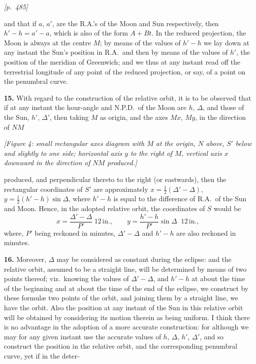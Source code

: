 \documentclass[11pt]{article}
\begin{document}
\medskip

\noindent\textit{[p.~485]}

\medskip

and that if $a$, $a'$, are the R.A.'s of the Moon and Sun respectively,
then $h'-h = a'-a$, which is also of the form $A + Bt$. In the reduced
projection, the Moon is always at the centre $M$; by means of the values
of $h'-h$ we lay down at any instant the Sun's position in R.A.\ and then
by means of the values of $h'$, the position of the meridian of
Greenwich; and we thus at any instant read off the terrestrial longitude
of any point of the reduced projection, or say, of a point on the
penumbral curve.

\medskip

\textbf{15.} With regard to the construction of the relative orbit, it is
to be observed that if at any instant the hour-angle and N.P.D.\ of the
Moon are $h$, $\Delta$, and those of the Sun, $h'$, $\Delta'$, then
taking $M$ as origin, and the axes $Mx$, $My$, in the direction of $NM$

\begin{center}
\textit{[Figure 4: small rectangular axes diagram with $M$ at the origin,
$N$ above, $S'$ below and slightly to one side; horizontal axis $y$ to the
right of $M$, vertical axis $x$ downward in the direction of $NM$
produced.]}
\end{center}

\smallskip

\noindent produced, and perpendicular thereto to the right (or
eastwards), then the rectangular coordinates of $S'$ are approximately
$x = \tfrac{1}{2}(\Delta'-\Delta)$, $y = \tfrac{1}{2}(h'-h)\sin\Delta$,
where $h'-h$ is equal to the difference of R.A.\ of the Sun and Moon.
Hence, in the adopted relative orbit, the coordinates of $S$ would be
\[
x = \frac{\Delta'-\Delta}{P'}\;12\,\text{in.}, \qquad
y = \frac{h'-h}{P'}\sin\Delta\;\;12\,\text{in.},
\]
where, $P'$ being reckoned in minutes, $\Delta'-\Delta$ and $h'-h$ are
also reckoned in minutes.

\medskip

\textbf{16.} Moreover, $\Delta$ may be considered as constant during the
eclipse: and the relative orbit, assumed to be a straight line, will be
determined by means of two points thereof; viz.\ knowing the values of
$\Delta'-\Delta$, and $h'-h$ at about the time of the beginning and at
about the time of the end of the eclipse, we construct by these formul\ae{}
two points of the orbit, and joining them by a straight line, we have the
orbit. Also the position at any instant of the Sun in this relative orbit
will be obtained by considering its motion therein as being uniform. I
think there is no advantage in the adoption of a more accurate
construction: for although we may for any given instant use the accurate
values of $h$, $\Delta$, $h'$, $\Delta'$, and so construct the position
in the relative orbit, and the corresponding penumbral curve, yet if in
the deter-
\end{document}
